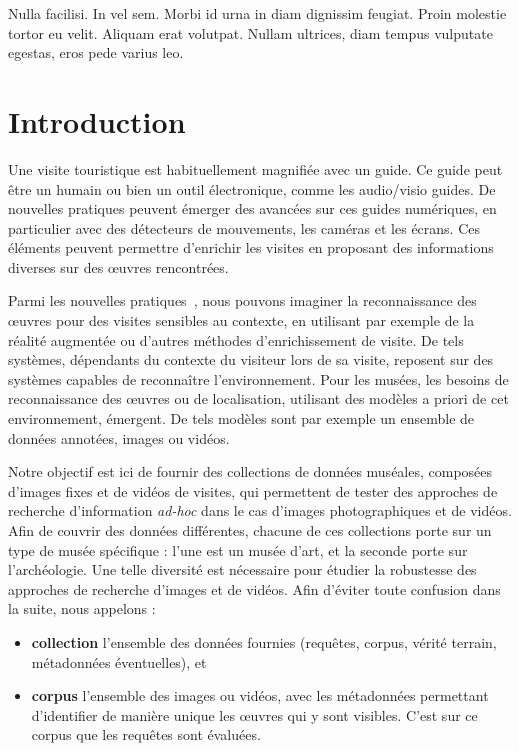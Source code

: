 \begin{savequote}[75mm] 
Nulla facilisi. In vel sem. Morbi id urna in diam dignissim feugiat. Proin molestie tortor eu velit. Aliquam erat volutpat. Nullam ultrices, diam tempus vulputate egestas, eros pede varius leo.
\end{savequote}

\chapter{Introduction}

Une visite touristique est habituellement magnifiée avec un guide. Ce guide peut être un humain ou bien un outil électronique, comme les audio/visio guides. De nouvelles pratiques peuvent émerger des avancées sur ces guides numériques, en particulier avec des détecteurs de mouvements, les caméras et les écrans. Ces éléments peuvent permettre d'enrichir les visites en proposant des informations diverses sur des œuvres rencontrées.

Parmi les nouvelles pratiques~\cite{andr2014}, nous pouvons imaginer la reconnaissance des œuvres pour des visites sensibles au contexte, en utilisant par exemple de la réalité augmentée ou d'autres méthodes d'enrichissement de visite. De tels systèmes, dépendants du contexte du visiteur lors de sa visite, reposent sur des systèmes capables de reconnaître l'environnement. Pour les musées, les besoins de reconnaissance des œuvres ou de localisation, utilisant des modèles a priori de cet environnement, émergent. De tels modèles sont par exemple un ensemble de données annotées, images ou vidéos.

Notre objectif est ici de fournir des collections de données muséales, composées d'images fixes et de vidéos de visites, qui permettent de tester des approches de recherche d'information {\it ad-hoc} dans le cas d'images photographiques et de vidéos. Afin de couvrir des données différentes, chacune de ces collections porte sur un type de musée spécifique : l'une est un musée d'art, et la seconde porte sur l'archéologie. Une telle diversité est nécessaire pour étudier la robustesse des approches de recherche d'images et de vidéos. Afin d'éviter toute confusion dans la suite, nous appelons :
\begin{itemize}
\item {\bf collection} l'ensemble des données fournies (requêtes, corpus, vérité terrain, métadonnées éventuelles), et 
\item {\bf corpus} l'ensemble des images ou vidéos, avec les métadonnées permettant d'identifier de manière unique les œuvres qui y sont visibles. C'est sur ce corpus que les requêtes sont évaluées.
\end{itemize}

